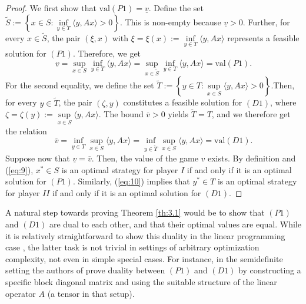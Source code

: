 \documentclass[11pt, twoside]{article}
\numberwithin{equation}{section}
\theoremstyle{definition}
\begin{document}
\begin{proof}
We first show that $\text{val}(P1)=\underline{v}$. Define the set $\widetilde{S}:= \left\{x\in S:\inf\limits_{y\in T}\langle y,Ax\rangle >0\right\}$. This is non-empty because $\underline{v}>0$. Further, for every $x\in\widetilde{S}$, the pair $(\xi,x)$ with $\xi=\xi(x):= \inf\limits_{y\in T}\langle y,Ax\rangle$ represents a feasible solution for \hyperlink{p1}{$(P1)$}. Therefore, we get 
\begin{equation}\label{eq:9}    \underline{v}=\sup\limits_{x\in S}\inf\limits_{y\in T}\langle y,Ax\rangle=\sup\limits_{x\in \widetilde{S}}\inf\limits_{y\in T}\langle y,Ax\rangle=\text{val}(P1).
\end{equation}  
For the second equality, we define the set $\widetilde{T}:= \left\{y\in T:\sup\limits_{x\in S}\langle y,Ax\rangle>0\right\}$.Then, for every $y\in\widetilde{T}$, the pair $(\zeta,y)$ constitutes a feasible solution for \hyperlink{d1}{$(D1)$}, where $\zeta=\zeta(y):= \sup\limits_{x\in S}\langle y,Ax\rangle$. The bound $\overline{v}>0$ yields $\widetilde{T}=T$, and we therefore get the relation
 \begin{equation}\label{eq:10}
    \overline{v}=\inf\limits_{y\in T}\sup\limits_{x\in S}\langle y,Ax\rangle=\inf\limits_{y\in \widetilde{T}}\sup\limits_{x\in S}\langle y,Ax\rangle=\text{val}(D1).
 \end{equation}
Suppose now that $\underline{v}=\overline{v}$. Then, the value of the game $v$ exists. By definition and (\ref{eq:9}), $x^*\in S$ is an optimal strategy for player $I$ if and only if it is an optimal solution for \hyperlink{p1}{$(P1)$}. Similarly, (\ref{eq:10}) implies that $y^*\in T$ is an optimal strategy for player $II$ if and only if it is an optimal solution for \hyperlink{d1}{$(D1)$}.
\end{proof}

A natural step towards proving Theorem \ref{th:3.1} would be to show that \hyperlink{p1}{$(P1)$} and \hyperlink{d1}{$(D1)$} are dual to each other, and that their optimal values are equal. While it is relatively straightforward to show this duality in the linear programming case \cite[pp. 286, Theorem 1]{dantzig2016linear}, the latter task is not trivial in settings of arbitrary optimization complexity, not even in simple special cases. For instance, in the semidefinite setting the authors of \cite{ickstadt2024semidefinite} prove duality between \hyperlink{p1}{$(P1)$} and \hyperlink{d1}{$(D1)$} by constructing a specific block diagonal matrix and using the suitable structure of the linear operator $A$ (a tensor in that setup).\par
\end{document}
